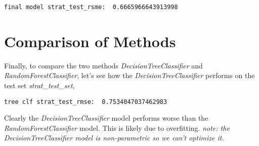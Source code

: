 \documentclass[8pt]{article}
\begin{document}
\newline
\newline
\begin{adjustbox}{max width=\textwidth}
\begin{lstlisting}
final model strat_test_rsme:  0.6665966643913998
\end{lstlisting}
\end{adjustbox}
\section{Comparison of Methods}
Finally, to compare the two methods \textit{DecisionTreeClassifier} and \textit{RandomForestClassifier}, let's see how the \textit{DecisionTreeClassifier} performs on the test set \textit{strat\_test\_set},
\newline
\newline
\begin{adjustbox}{max width=\textwidth}
\begin{lstlisting}
tree clf strat_test_rmse:  0.7534047037462983
\end{lstlisting}
\end{adjustbox}
\newline
\newline
Clearly the \textit{DecisionTreeClassifier} model performs worse than the \textit{RandomForestClassifier} model. This is likely due to overfitting.
\newline
\textit{note: the DecisionTreeClassifier model is non-parametric so we can't optimize it. }
\end{document}
